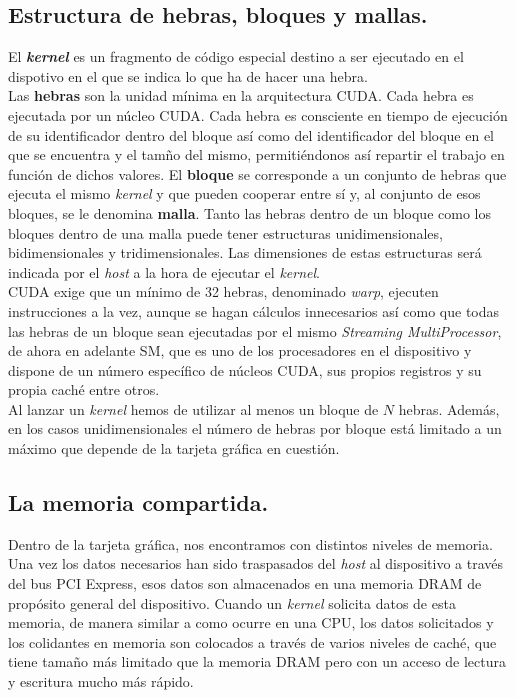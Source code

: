 \subsection{Estructura de hebras, bloques y mallas.}
El \textbf{\textit{kernel}} es un fragmento de código especial destino a ser ejecutado en el dispotivo en el que se indica lo que ha de hacer una hebra.\\

Las \textbf{hebras} son la unidad mínima en la arquitectura CUDA. Cada hebra es ejecutada por un núcleo CUDA. Cada hebra es consciente en tiempo de ejecución de su identificador dentro del bloque así como del identificador del bloque en el que se encuentra y el tamño del mismo, permitiéndonos así repartir el trabajo en función de dichos valores. El \textbf{bloque} se corresponde a un conjunto de hebras que ejecuta el mismo \textit{kernel} y que pueden cooperar entre sí y, al conjunto de esos bloques, se le denomina \textbf{malla}. Tanto las hebras dentro de un bloque como los bloques dentro de una malla puede tener estructuras unidimensionales, bidimensionales y tridimensionales. Las dimensiones de estas estructuras será indicada por el \textit{host} a la hora de ejecutar el \textit{kernel}.\\

CUDA exige que un mínimo de 32 hebras, denominado \textit{warp}, ejecuten instrucciones a la vez, aunque se hagan cálculos innecesarios así como que todas las hebras de un bloque sean ejecutadas por el mismo \textit{Streaming MultiProcessor}, de ahora en adelante SM, que es uno de los procesadores en el dispositivo y dispone de un número específico de núcleos CUDA, sus propios registros y su propia caché entre otros.\\

Al lanzar un \textit{kernel} hemos de utilizar al menos un bloque de $N$ hebras. Además, en los casos unidimensionales el número de hebras por bloque está limitado a un máximo que depende de la tarjeta gráfica en cuestión.

\subsection{La memoria compartida.}
Dentro de la tarjeta gráfica, nos encontramos con distintos niveles de memoria. Una vez los datos necesarios han sido traspasados del \textit{host} al dispositivo a través del bus PCI Express, esos datos son almacenados en una memoria DRAM de propósito general del dispositivo. Cuando un \textit{kernel} solicita datos de esta memoria, de manera similar a como ocurre en una CPU, los datos solicitados y los colidantes en memoria son colocados a través de varios niveles de caché, que tiene tamaño más limitado que la memoria DRAM pero con un acceso de lectura y escritura mucho más rápido.\\

